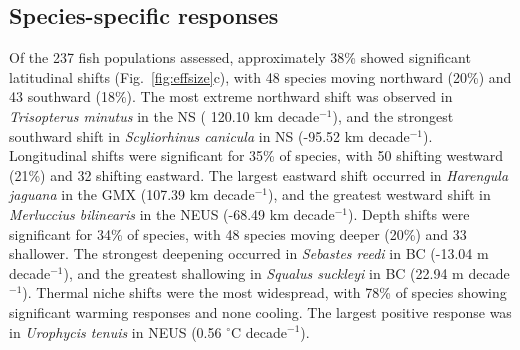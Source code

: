 \documentclass[11pt]{article}
\begin{document}
\begin{spacing}{1.5}
\subsection{Species-specific responses}

Of the 237 fish populations assessed, approximately 38\% showed significant latitudinal shifts (Fig.~\ref{fig:effsize}c), with 48 species moving northward (20\%) and 43 southward (18\%). The most extreme northward shift was observed in \textit{Trisopterus minutus} in the NS ( 120.10 km decade$^{-1}$), and the strongest southward shift in \textit{Scyliorhinus canicula} in NS (-95.52 km decade$^{-1}$).  
Longitudinal shifts were significant for 35\% of species, with 50 shifting westward (21\%) and 32 shifting eastward. The largest eastward shift occurred in \textit{Harengula jaguana} in the GMX (107.39 km decade$^{-1}$), and the greatest westward shift in \textit{Merluccius bilinearis} in the NEUS (-68.49 km decade$^{-1}$).  
Depth shifts were significant for 34\% of species, with 48 species moving deeper (20\%) and 33 shallower. The strongest deepening occurred in \textit{Sebastes reedi} in BC (-13.04 m decade$^{-1}$), and the greatest shallowing in \textit{Squalus suckleyi} in BC (22.94 m decade$^{-1}$).  
Thermal niche shifts were the most widespread, with 78\% of species showing significant warming responses and none cooling. The largest positive response was in \textit{Urophycis tenuis} in NEUS (0.56 $^\circ$C decade$^{-1}$).  



\end{spacing}
\end{document}
